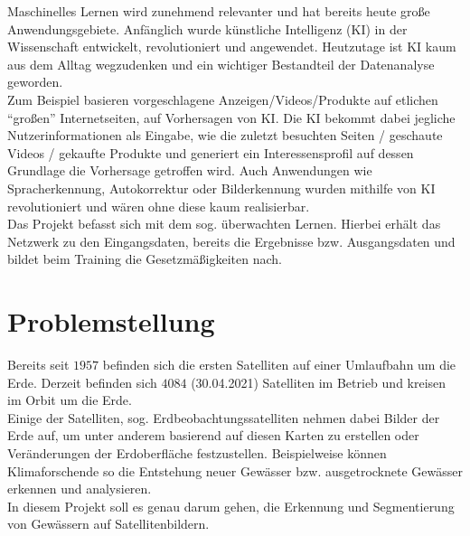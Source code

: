 Maschinelles Lernen wird zunehmend relevanter und hat bereits heute große Anwendungsgebiete.
Anfänglich wurde künstliche Intelligenz (KI) in der Wissenschaft entwickelt, revolutioniert und angewendet.
Heutzutage ist KI kaum aus dem Alltag wegzudenken und ein wichtiger Bestandteil der Datenanalyse geworden.
\\
Zum Beispiel basieren vorgeschlagene Anzeigen/Videos/Produkte auf etlichen \enquote{großen} Internetseiten, auf Vorhersagen von KI.
Die KI bekommt dabei jegliche Nutzerinformationen als Eingabe, wie die zuletzt besuchten Seiten / geschaute Videos / gekaufte Produkte und generiert ein Interessensprofil auf dessen Grundlage die Vorhersage getroffen wird.
Auch Anwendungen wie Spracherkennung, Autokorrektur oder Bilderkennung wurden mithilfe von KI revolutioniert und wären ohne diese kaum realisierbar.
\\
%
Das Projekt befasst sich mit dem sog. überwachten Lernen.
Hierbei erhält das Netzwerk zu den Eingangsdaten, bereits die Ergebnisse bzw. Ausgangsdaten und bildet beim Training die Gesetzmäßigkeiten nach.

\section{Problemstellung}
Bereits seit $1957$ befinden sich die ersten Satelliten auf einer Umlaufbahn um die Erde.
Derzeit befinden sich $4084$ (30.04.2021) Satelliten im Betrieb und kreisen im Orbit um die Erde.\cite{ucsusa}
\\
Einige der Satelliten, sog. Erdbeobachtungssatelliten nehmen dabei Bilder der Erde auf, um unter anderem basierend auf diesen Karten zu erstellen oder Veränderungen der Erdoberfläche festzustellen.
Beispielweise können Klimaforschende so die Entstehung neuer Gewässer bzw. ausgetrocknete Gewässer erkennen und analysieren.
\\
In diesem Projekt soll es genau darum gehen, die Erkennung und Segmentierung von Gewässern auf Satellitenbildern.
\\


